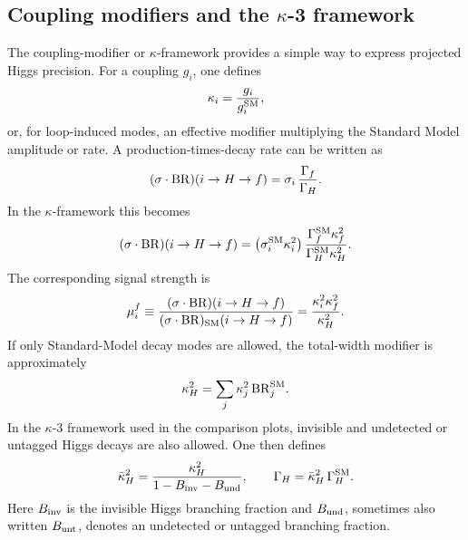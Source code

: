 \documentclass[11pt,a4paper]{report}
\begin{document}
\clearpage



\subsection{Coupling modifiers and the \texorpdfstring{\(\kappa\)-3}{kappa-3} framework}
\label{subsec:kappa3-framework-before-top}

The coupling-modifier or \(\kappa\)-framework provides a simple way to express
projected Higgs precision.  For a coupling \(g_i\), one defines
\begin{equation}
	\kappa_i
	=
	\frac{g_i}{g_i^{\rm SM}},
	\label{eq:kappa-definition-global}
\end{equation}
or, for loop-induced modes, an effective modifier multiplying the Standard
Model amplitude or rate.  A production-times-decay rate can be written as
\begin{equation}
	(\sigma\cdot{\rm BR})(i\to H\to f)
	=
	\sigma_i\,
	\frac{\Gamma_f}{\Gamma_H}.
	\label{eq:sigma-br-basic-global}
\end{equation}
In the \(\kappa\)-framework this becomes
\begin{equation}
	(\sigma\cdot{\rm BR})(i\to H\to f)
	=
	\left(\sigma_i^{\rm SM}\kappa_i^2\right)
	\frac{\Gamma_f^{\rm SM}\kappa_f^2}
	{\Gamma_H^{\rm SM}\kappa_H^2}.
	\label{eq:sigma-br-kappa-global}
\end{equation}
The corresponding signal strength is
\begin{equation}
	\mu_i^f
	\equiv
	\frac{(\sigma\cdot{\rm BR})(i\to H\to f)}
	{(\sigma\cdot{\rm BR})_{\rm SM}(i\to H\to f)}
	=
	\frac{\kappa_i^2\kappa_f^2}{\kappa_H^2}.
	\label{eq:mu-kappa-global}
\end{equation}
If only Standard-Model decay modes are allowed, the total-width modifier is
approximately
\begin{equation}
	\kappa_H^2
	=
	\sum_j
	\kappa_j^2\,{\rm BR}^{\rm SM}_j .
	\label{eq:kappaH-sum-global}
\end{equation}
In the \(\kappa\)-3 framework used in the comparison plots, invisible and
undetected or untagged Higgs decays are also allowed.  One then defines
\begin{equation}
	\bar\kappa_H^2
	=
	\frac{\kappa_H^2}
	{1-B_{\rm inv}-B_{\rm und}},
	\qquad
	\Gamma_H
	=
	\bar\kappa_H^2\,\Gamma_H^{\rm SM}.
	\label{eq:kappa3-total-width-global}
\end{equation}
Here \(B_{\rm inv}\) is the invisible Higgs branching fraction and
\(B_{\rm und}\), sometimes also written \(B_{\rm unt}\), denotes an
undetected or untagged branching fraction.
\end{document}
